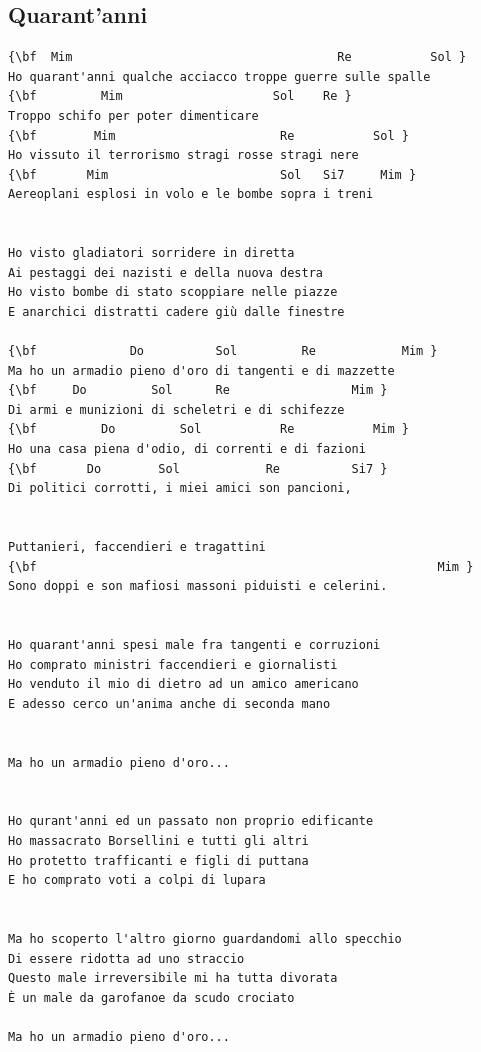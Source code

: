 \documentclass[a4paper]{article}
\begin{document}
\subsection{Quarant'anni}
\begin{Verbatim}[commandchars=\\\{\}]
{\bf  Mim                                     Re           Sol }
Ho quarant'anni qualche acciacco troppe guerre sulle spalle 
{\bf         Mim                     Sol    Re }
Troppo schifo per poter dimenticare 
{\bf        Mim                       Re           Sol }
Ho vissuto il terrorismo stragi rosse stragi nere 
{\bf       Mim                        Sol   Si7     Mim }
Aereoplani esplosi in volo e le bombe sopra i treni 


Ho visto gladiatori sorridere in diretta 
Ai pestaggi dei nazisti e della nuova destra 
Ho visto bombe di stato scoppiare nelle piazze 
E anarchici distratti cadere giù dalle finestre 

{\bf             Do          Sol         Re            Mim }
Ma ho un armadio pieno d'oro di tangenti e di mazzette 
{\bf     Do         Sol      Re                 Mim }
Di armi e munizioni di scheletri e di schifezze 
{\bf         Do         Sol           Re           Mim }
Ho una casa piena d'odio, di correnti e di fazioni 
{\bf       Do        Sol            Re          Si7 }
Di politici corrotti, i miei amici son pancioni, 


Puttanieri, faccendieri e tragattini 
{\bf                                                        Mim }
Sono doppi e son mafiosi massoni piduisti e celerini. 


Ho quarant'anni spesi male fra tangenti e corruzioni 
Ho comprato ministri faccendieri e giornalisti 
Ho venduto il mio di dietro ad un amico americano 
E adesso cerco un'anima anche di seconda mano 


Ma ho un armadio pieno d'oro...


Ho qurant'anni ed un passato non proprio edificante 
Ho massacrato Borsellini e tutti gli altri 
Ho protetto trafficanti e figli di puttana 
E ho comprato voti a colpi di lupara 


Ma ho scoperto l'altro giorno guardandomi allo specchio 
Di essere ridotta ad uno straccio 
Questo male irreversibile mi ha tutta divorata 
È un male da garofanoe da scudo crociato 

Ma ho un armadio pieno d'oro...

\end{Verbatim}
\newpage
\end{document}
